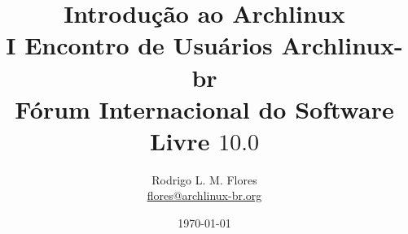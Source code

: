 \documentclass{beamer}
\title{Introdução ao Archlinux\\I Encontro de Usuários Archlinux-br\\Fórum Internacional do Software Livre $10.0$}
\author{Rodrigo L. M. Flores \\ \url{flores@archlinux-br.org}}
\begin{document}
\date{\today}

\frame{\titlepage}
\end{document}
